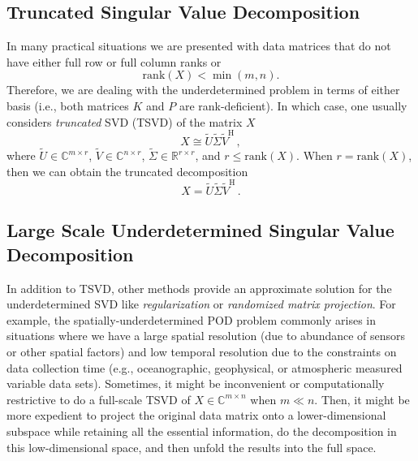 \documentclass[10pt]{article}
\begin{document}
\subsection{Truncated Singular Value Decomposition}

In many practical situations we are presented with data matrices that do not have either full row or full column ranks or $$\mathrm{rank}(X) < \min(m,n).$$ 
Therefore, we are dealing with the underdetermined problem in terms of either basis (i.e., both matrices $K$ and $P$ are rank-deficient).
In which case, one usually considers {\em truncated} SVD (TSVD) of the matrix $X$
\begin{equation}
    X \cong \tilde U \tilde \Sigma \tilde V^\mathrm{H}\,,
\end{equation}
where $\tilde U \in \mathbb{C}^{m\times r}$, $\tilde V \in \mathbb{C}^{n\times r}$, $\tilde \Sigma \in \mathbb{R}^{r\times r}$, and $r\le\mathrm{rank}(X)$.
When $r=\mathrm{rank}(X)$, then we can obtain the truncated decomposition
\begin{equation}
    X = \tilde U \tilde \Sigma \tilde V^\mathrm{H}\,.
\end{equation}

\subsection{Large Scale Underdetermined Singular Value Decomposition}
In addition to TSVD, other methods provide an approximate solution for the underdetermined SVD like {\em regularization} or {\em randomized matrix projection}.
For example, the spatially-underdetermined POD problem commonly arises in situations where we have a large spatial resolution (due to abundance of sensors or other spatial factors) and low temporal resolution due to the constraints on data collection time (e.g., oceanographic, geophysical, or atmospheric measured variable data sets).
Sometimes, it might be inconvenient or computationally restrictive to do a full-scale TSVD of $X\in \mathbb{C}^{m\times n}$ when $m\ll n$. 
Then, it might be more expedient to project the original data matrix onto a lower-dimensional subspace while retaining all the essential information, do the decomposition in this low-dimensional space, and then unfold the results into the full space.
\end{document}
